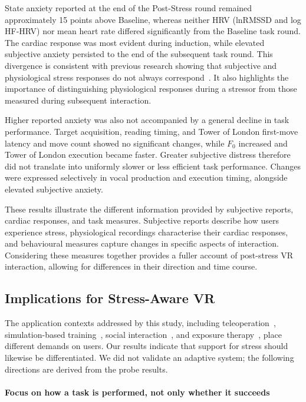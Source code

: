 State anxiety reported at the end of the Post-Stress round remained approximately 15 points above Baseline, whereas neither HRV (lnRMSSD and log HF-HRV) nor mean heart rate differed significantly from the Baseline task round. The cardiac response was most evident during induction, while elevated subjective anxiety persisted to the end of the subsequent task round. This divergence is consistent with previous research showing that subjective and physiological stress responses do not always correspond~\citep{campbell2012acute}. It also highlights the importance of distinguishing physiological responses during a stressor from those measured during subsequent interaction.

Higher reported anxiety was also not accompanied by a general decline in task performance. Target acquisition, reading timing, and Tower of London first-move latency and move count showed no significant changes, while \(F_0\) increased and Tower of London execution became faster. Greater subjective distress therefore did not translate into uniformly slower or less efficient task performance. Changes were expressed selectively in vocal production and execution timing, alongside elevated subjective anxiety.

These results illustrate the different information provided by subjective reports, cardiac responses, and task measures. Subjective reports describe how users experience stress, physiological recordings characterise their cardiac responses, and behavioural measures capture changes in specific aspects of interaction. Considering these measures together provides a fuller account of post-stress VR interaction, allowing for differences in their direction and time course.


\subsection{Implications for Stress-Aware VR}
\label{sec:discussion-implications}

The application contexts addressed by this study, including teleoperation~\citep{haidegger2011surgery}, simulation-based training~\citep{radianti2020systematic}, social interaction~\citep{li2021social,wei2022communication}, and exposure therapy~\citep{carl2019virtual}, place different demands on users. Our results indicate that support for stress should likewise be differentiated. We did not validate an adaptive system; the following directions are derived from the probe results.

\paragraph{Focus on how a task is performed, not only whether it succeeds}

